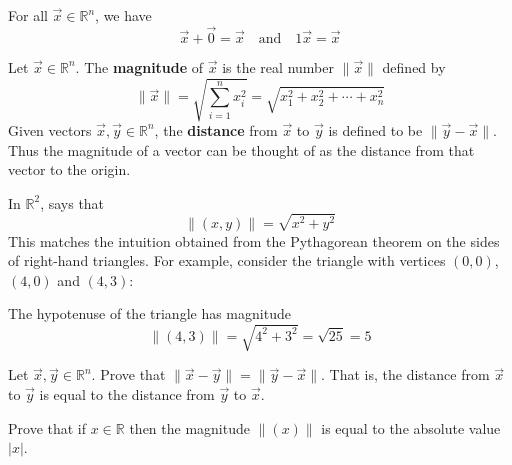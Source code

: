 \begin{example}
For all $\vec x \in \mathbb{R}^n$, we have
\[ \vec x + \vec 0 = \vec x \quad \text{and} \quad 1 \vec x = \vec x \]
\end{example}

\begin{definition}
\label{defMagnitude}
Let $\vec x \in \mathbb{R}^n$. The \textbf{magnitude} of $\vec x$ is the real number $\lVert \vec x \rVert$  defined by
\[ \lVert \vec x \rVert = \sqrt{\sum_{i=1}^n x_i^2} = \sqrt{x_1^2+x_2^2+\cdots+x_n^2} \]
Given vectors $\vec x, \vec y \in \mathbb{R}^n$, the \textbf{distance} from $\vec x$ to $\vec y$ is defined to be $\lVert \vec y - \vec x \rVert$. Thus the magnitude of a vector can be thought of as the distance from that vector to the origin.
\end{definition}

\begin{example}
\label{exMagnitudeInR2}
In $\mathbb{R}^2$,  says that
\[ \lVert (x,y) \rVert = \sqrt{x^2+y^2} \]
This matches the intuition obtained from the Pythagorean theorem on the sides of right-hand triangles. For example, consider the triangle with vertices $(0,0)$, $(4,0)$ and $(4,3)$:
\begin{center}
\end{center}
The hypotenuse of the triangle has magnitude
\[ \lVert (4,3) \rVert = \sqrt{4^2+3^2} = \sqrt{25} = 5 \]
\end{example}

\begin{exercise}
\label{exDistanceIsSymmetric}
Let $\vec x, \vec y \in \mathbb{R}^n$. Prove that $\lVert \vec x - \vec y \rVert = \lVert \vec y - \vec x \rVert$. That is, the distance from $\vec x$ to $\vec y$ is equal to the distance from $\vec y$ to $\vec x$.
\end{exercise}

\begin{exercise}
Prove that if $x \in \mathbb{R}$ then the magnitude $\lVert (x) \rVert$ is equal to the absolute value $|x|$.
\end{exercise}

